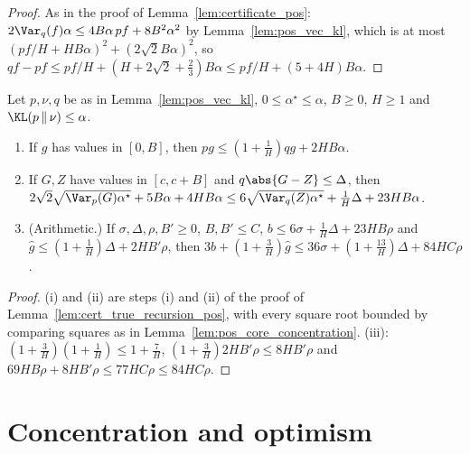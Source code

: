 \begin{proof}
\leanok
As in the proof of Lemma~\ref{lem:certificate_pos}: $2\Var_q(f)\alpha \le 4B\alpha\,pf + 8B^2\alpha^2$ by
Lemma~\ref{lem:pos_vec_kl}, which is at most $(pf/H + HB\alpha)^2 + (2\sqrt2B\alpha)^2$, so
$qf - pf \le pf/H + (H + 2\sqrt2 + \frac23)B\alpha \le pf/H + (5 + 4H)B\alpha$.
\end{proof}

\begin{lemma}\label{lem:pos_core_recursion}
\leanok
{}
Let $p, \nu, q$ be as in Lemma~\ref{lem:pos_vec_kl}, $0 \le \alpha^\star \le \alpha$, $B \ge 0$, $H \ge 1$ and
$\KL(p \,\|\, \nu) \le \alpha$.
\begin{enumerate}
  \item[(i)] If $g$ has values in $[0, B]$, then $pg \le (1 + \frac1H)qg + 2HB\alpha$.
  \item[(ii)] If $G, Z$ have values in $[c, c + B]$ and $q\abs{G - Z} \le \Delta$, then
        $2\sqrt2\sqrt{\Var_p(G)\alpha^\star} + 5B\alpha + 4HB\alpha \le 6\sqrt{\Var_q(Z)\alpha^\star} + \frac1H\Delta + 23HB\alpha$.
  \item[(iii)] (Arithmetic.) If $\sigma, \Delta, \rho, B' \ge 0$, $B, B' \le C$, $b \le 6\sigma + \frac1H\Delta + 23HB\rho$
        and $\hat g \le (1 + \frac1H)\Delta + 2HB'\rho$, then
        $3b + (1 + \frac3H)\hat g \le 36\sigma + (1 + \frac{13}H)\Delta + 84HC\rho$.
\end{enumerate}
\end{lemma}

\begin{proof}
\leanok
(i) and (ii) are steps (i) and (ii) of the proof of Lemma~\ref{lem:cert_true_recursion_pos}, with every
square root bounded by comparing squares as in Lemma~\ref{lem:pos_core_concentration}. (iii): $(1 + \frac3H)(1 + \frac1H) \le 1 + \frac7H$,
$(1 + \frac3H)2HB'\rho \le 8HB'\rho$ and $69HB\rho + 8HB'\rho \le 77HC\rho \le 84HC\rho$.
\end{proof}

\section{Concentration and optimism}
\label{sec:pos_optimism}

